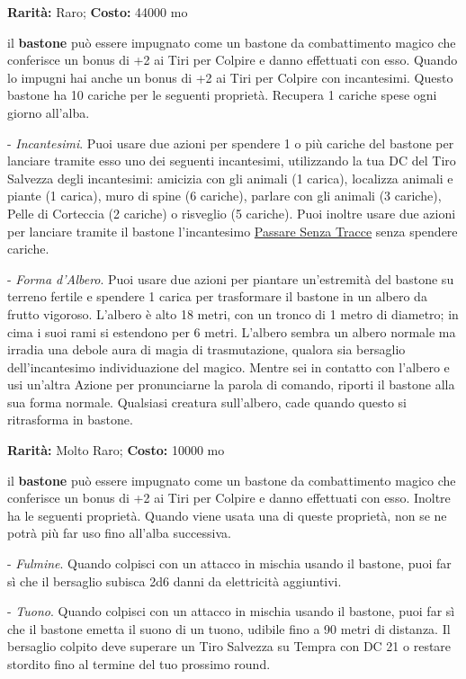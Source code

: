 \begin{multicols}{2}

\textbf{Rarità:} Raro; \textbf{Costo:} 44000 mo

il \textbf{bastone} può essere impugnato come un bastone da combattimento magico che conferisce un bonus di +2 ai Tiri per Colpire e danno effettuati con esso. Quando lo impugni hai anche un bonus di +2 ai Tiri per Colpire con incantesimi.
Questo bastone ha 10 cariche per le seguenti proprietà. Recupera 1 cariche spese ogni giorno all'alba.

- \emph{Incantesimi}. Puoi usare due azioni per spendere 1 o più cariche del bastone per lanciare tramite esso uno dei seguenti incantesimi, utilizzando la tua DC del Tiro Salvezza degli incantesimi: amicizia con gli animali (1 carica), localizza animali e piante (1 carica), muro di spine (6 cariche), parlare con gli animali (3 cariche), Pelle di Corteccia (2 cariche) o risveglio (5 cariche). Puoi inoltre usare due azioni per lanciare tramite il bastone l'incantesimo \hyperlink{Passare Senza Tracce}{Passare Senza Tracce} senza spendere cariche.

- \emph{Forma d'Albero}. Puoi usare due azioni per piantare un'estremità del bastone su terreno fertile e spendere 1 carica per trasformare il bastone in un albero da frutto vigoroso. L'albero è alto 18 metri, con un tronco di 1 metro di diametro; in cima i suoi rami si estendono per 6 metri. L'albero sembra un albero normale ma irradia una debole aura di magia di trasmutazione, qualora sia bersaglio dell'incantesimo individuazione del magico. Mentre sei in contatto con l'albero e usi un'altra Azione per pronunciarne la parola di comando, riporti il bastone alla sua forma normale. Qualsiasi creatura sull'albero, cade quando questo si ritrasforma in bastone.


\textbf{Rarità:} Molto Raro; \textbf{Costo:} 10000 mo

il \textbf{bastone} può essere impugnato come un bastone da combattimento magico che conferisce un bonus di +2 ai Tiri per Colpire e danno effettuati con esso. Inoltre ha le seguenti proprietà. Quando viene usata una di queste proprietà, non se ne potrà più far uso fino all'alba successiva.

- \emph{Fulmine}. Quando colpisci con un attacco in mischia usando il bastone, puoi far sì che il bersaglio subisca 2d6 danni da elettricità aggiuntivi.

- \emph{Tuono}. Quando colpisci con un attacco in mischia usando il bastone, puoi far sì che il bastone emetta il suono di un tuono, udibile fino a 90 metri di distanza. Il bersaglio colpito deve superare un Tiro Salvezza su Tempra con DC 21 o restare stordito fino al termine del tuo prossimo round.


\end{multicols}
